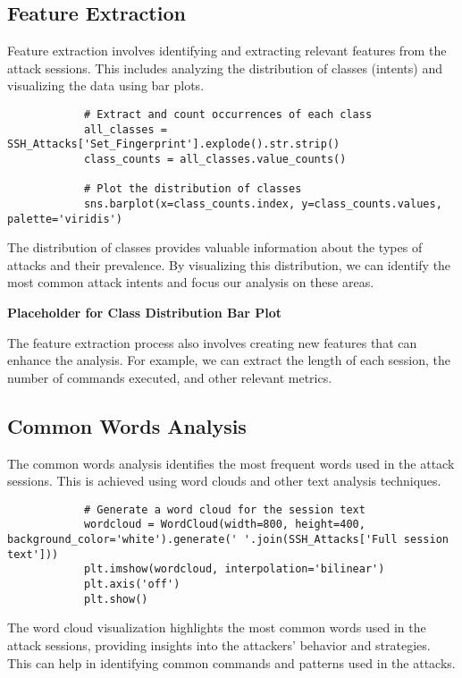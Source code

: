     \subsection{Feature Extraction}
    
        Feature extraction involves identifying and extracting relevant features from the attack sessions. This includes analyzing the distribution of classes (intents) and visualizing the data using bar plots.

        \begin{verbatim}
            # Extract and count occurrences of each class
            all_classes = SSH_Attacks['Set_Fingerprint'].explode().str.strip()
            class_counts = all_classes.value_counts()

            # Plot the distribution of classes
            sns.barplot(x=class_counts.index, y=class_counts.values, palette='viridis')
        \end{verbatim}

        The distribution of classes provides valuable information about the types of attacks and their prevalence. By visualizing this distribution, we can identify the most common attack intents and focus our analysis on these areas.

        \textbf{Placeholder for Class Distribution Bar Plot}

        The feature extraction process also involves creating new features that can enhance the analysis. For example, we can extract the length of each session, the number of commands executed, and other relevant metrics.

    \subsection{Common Words Analysis}
    
        The common words analysis identifies the most frequent words used in the attack sessions. This is achieved using word clouds and other text analysis techniques.

        \begin{verbatim}
            # Generate a word cloud for the session text
            wordcloud = WordCloud(width=800, height=400, background_color='white').generate(' '.join(SSH_Attacks['Full session text']))
            plt.imshow(wordcloud, interpolation='bilinear')
            plt.axis('off')
            plt.show()
        \end{verbatim}

        The word cloud visualization highlights the most common words used in the attack sessions, providing insights into the attackers' behavior and strategies. This can help in identifying common commands and patterns used in the attacks.

